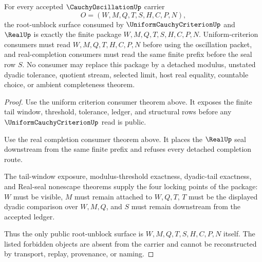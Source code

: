 \begin{theorem}
\label{thm:cauchy-oscillation-root-unblock-package}
For every accepted $\CauchyOscillationUp$ carrier
$$
O=(W,M,Q,T,S,H,C,P,N),
$$
the root-unblock surface consumed by $\UniformCauchyCriterionUp$ and $\RealUp$ is exactly the finite package $W,M,Q,T,S,H,C,P,N$. Uniform-criterion consumers must read $W,M,Q,T,H,C,P,N$ before using the oscillation packet, and real-completion consumers must read the same finite prefix before the seal row $S$. No consumer may replace this package by a detached modulus, unstated dyadic tolerance, quotient stream, selected limit, host real equality, countable choice, or ambient completeness theorem.
\end{theorem}
\begin{proof}
Use the uniform criterion consumer theorem above. It exposes the finite tail window, threshold, tolerance, ledger, and structural rows before any $\UniformCauchyCriterionUp$ read is public.

Use the real completion consumer theorem above. It places the $\RealUp$ seal downstream from the same finite prefix and refuses every detached completion route.

The tail-window exposure, modulus-threshold exactness, dyadic-tail exactness, and Real-seal nonescape theorems supply the four locking points of the package: $W$ must be visible, $M$ must remain attached to $W,Q,T$, $T$ must be the displayed dyadic comparison over $W,M,Q$, and $S$ must remain downstream from the accepted ledger.

Thus the only public root-unblock surface is $W,M,Q,T,S,H,C,P,N$ itself. The listed forbidden objects are absent from the carrier and cannot be reconstructed by transport, replay, provenance, or naming.
\end{proof}

